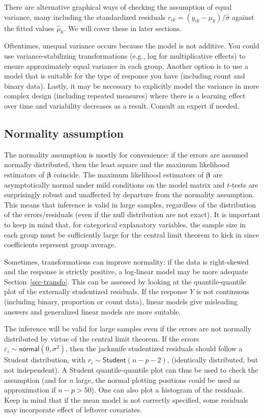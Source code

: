 \documentclass[
  11pt,
  letterpaper,
]{scrbook}
\theoremstyle{definition}
\theoremstyle{definition}
\theoremstyle{plain}
\theoremstyle{plain}
\theoremstyle{remark}
\begin{document}
There are alternative graphical ways of checking the assumption of equal
variance, many including the standardized residuals
\(r_{ik} = (y_{ik} - \widehat{\mu}_k)/\widehat{\sigma}\) against the
fitted values \(\widehat{\mu}_k\). We will cover these in later
sections.

Oftentimes, unequal variance occurs because the model is not additive.
You could use variance-stabilizing transformations (e.g., log for
multiplicative effects) to ensure approximately equal variance in each
group. Another option is to use a model that is suitable for the type of
response you have (including count and binary data). Lastly, it may be
necessary to explicitly model the variance in more complex design
(including repeated measures) where there is a learning effect over time
and variability decreases as a result. Consult an expert if needed.

\subsection{Normality assumption}\label{normality-assumption}

The normality assumption is mostly for convenience: if the errors are
assumed normally distributed, then the least square and the maximum
likelihood estimators of \(\boldsymbol{\beta}\) coincide. The maximum
likelihood estimators of \(\boldsymbol{\beta}\) are asymptotically
normal under mild conditions on the model matrix and \(t\)-tests are
surprisingly robust and unaffected by departure from the normality
assumption. This means that inference is valid in large samples,
regardless of the distribution of the errors/residuals (even if the null
distribution are not exact). It is important to keep in mind that, for
categorical explanatory variables, the sample size in each group must be
sufficiently large for the central limit theorem to kick in since
coefficients represent group average.

Sometimes, transformations can improve normality: if the data is
right-skewed and the response is strictly positive, a log-linear model
may be more adequate Section~\ref{sec-transfo}. This can be assessed by
looking at the quantile-quantile plot of the externally studentized
residuals. If the response \(Y\) is not continuous (including binary,
proportion or count data), linear models give misleading answers and
generalized linear models are more suitable.

The inference will be valid for large samples even if the errors are not
normally distributed by virtue of the central limit theorem. If the
errors \(\varepsilon_i \sim \mathsf{normal}(0, \sigma^2)\), then the
jacknnife studentized residuals should follow a Student distribution,
with \(r_i \sim \mathsf{Student}(n-p-2)\), (identically distributed, but
not independent). A Student quantile-quantile plot can thus be used to
check the assumption (and for \(n\) large, the normal plotting positions
could be used as approximation if \(n-p> 50\)). One can also plot a
histogram of the residuals. Keep in mind that if the mean model is not
correctly specified, some residuals may incorporate effect of leftover
covariates.
\end{document}

